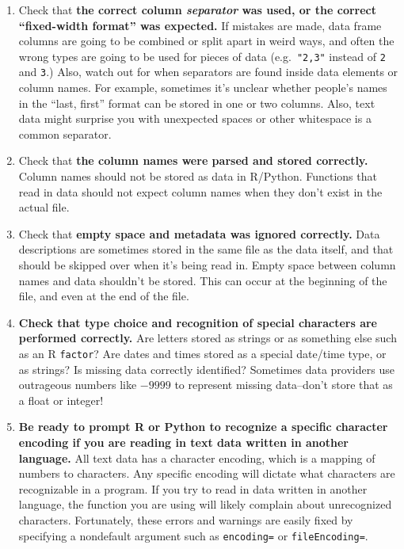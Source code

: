 \documentclass[
  12pt,
  krantz2]{krantz}
\providecommand{\tightlist}{%
  \setlength{\itemsep}{0pt}\setlength{\parskip}{0pt}}
\begin{document}
\begin{enumerate}
\def\labelenumi{\arabic{enumi}.}
\tightlist
\item
  Check that \textbf{the correct column \emph{separator} was used, or the correct ``fixed-width format'' was expected.} If mistakes are made, data frame columns are going to be combined or split apart in weird ways, and often the wrong types are going to be used for pieces of data (e.g.~\texttt{"2,3"} instead of \texttt{2} and \texttt{3}.) Also, watch out for when separators are found inside data elements or column names. For example, sometimes it's unclear whether people's names in the ``last, first'' format can be stored in one or two columns. Also, text data might surprise you with unexpected spaces or other whitespace is a common separator.
\item
  Check that \textbf{the column names were parsed and stored correctly.} Column names should not be stored as data in R/Python. Functions that read in data should not expect column names when they don't exist in the actual file.
\item
  Check that \textbf{empty space and metadata was ignored correctly.} Data descriptions are sometimes stored in the same file as the data itself, and that should be skipped over when it's being read in. Empty space between column names and data shouldn't be stored. This can occur at the beginning of the file, and even at the end of the file.
\item
  \textbf{Check that type choice and recognition of special characters are performed correctly.} Are letters stored as strings or as something else such as an R \texttt{factor}? Are dates and times stored as a special date/time type, or as strings? Is missing data correctly identified? Sometimes data providers use outrageous numbers like \(-9999\) to represent missing data--don't store that as a float or integer!
\item
  \textbf{Be ready to prompt R or Python to recognize a specific character encoding if you are reading in text data written in another language.} All text data has a character encoding, which is a mapping of numbers to characters. Any specific encoding will dictate what characters are recognizable in a program. If you try to read in data written in another language, the function you are using will likely complain about unrecognized characters. Fortunately, these errors and warnings are easily fixed by specifying a nondefault argument such as \texttt{encoding=} or \texttt{fileEncoding=}.
\end{enumerate}
\end{document}
